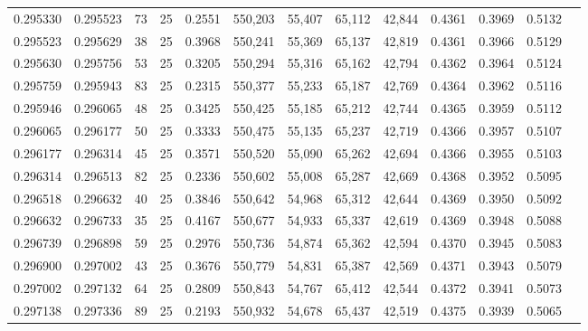 \begin{tabular}{rrrrrrrrrrrrr}
0.295330 & 0.295523 &    73 &  25 &                                     0.2551 & 550,203 &  55,407 &  65,112 &  42,844 & 0.4361 & 0.3969 & 0.5132 \\
0.295523 & 0.295629 &    38 &  25 &                                     0.3968 & 550,241 &  55,369 &  65,137 &  42,819 & 0.4361 & 0.3966 & 0.5129 \\
0.295630 & 0.295756 &    53 &  25 &                                     0.3205 & 550,294 &  55,316 &  65,162 &  42,794 & 0.4362 & 0.3964 & 0.5124 \\
0.295759 & 0.295943 &    83 &  25 &                                     0.2315 & 550,377 &  55,233 &  65,187 &  42,769 & 0.4364 & 0.3962 & 0.5116 \\
0.295946 & 0.296065 &    48 &  25 &                                     0.3425 & 550,425 &  55,185 &  65,212 &  42,744 & 0.4365 & 0.3959 & 0.5112 \\
0.296065 & 0.296177 &    50 &  25 &                                     0.3333 & 550,475 &  55,135 &  65,237 &  42,719 & 0.4366 & 0.3957 & 0.5107 \\
0.296177 & 0.296314 &    45 &  25 &                                     0.3571 & 550,520 &  55,090 &  65,262 &  42,694 & 0.4366 & 0.3955 & 0.5103 \\
0.296314 & 0.296513 &    82 &  25 &                                     0.2336 & 550,602 &  55,008 &  65,287 &  42,669 & 0.4368 & 0.3952 & 0.5095 \\
0.296518 & 0.296632 &    40 &  25 &                                     0.3846 & 550,642 &  54,968 &  65,312 &  42,644 & 0.4369 & 0.3950 & 0.5092 \\
0.296632 & 0.296733 &    35 &  25 &                                     0.4167 & 550,677 &  54,933 &  65,337 &  42,619 & 0.4369 & 0.3948 & 0.5088 \\
0.296739 & 0.296898 &    59 &  25 &                                     0.2976 & 550,736 &  54,874 &  65,362 &  42,594 & 0.4370 & 0.3945 & 0.5083 \\
0.296900 & 0.297002 &    43 &  25 &                                     0.3676 & 550,779 &  54,831 &  65,387 &  42,569 & 0.4371 & 0.3943 & 0.5079 \\
0.297002 & 0.297132 &    64 &  25 &                                     0.2809 & 550,843 &  54,767 &  65,412 &  42,544 & 0.4372 & 0.3941 & 0.5073 \\
0.297138 & 0.297336 &    89 &  25 &                                     0.2193 & 550,932 &  54,678 &  65,437 &  42,519 & 0.4375 & 0.3939 & 0.5065 \\

\end{tabular}
